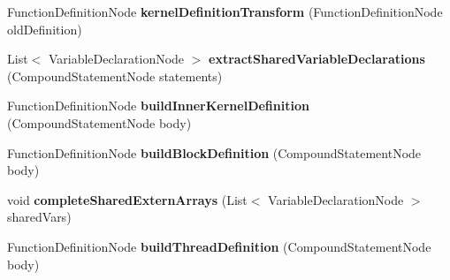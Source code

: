 \begin{DoxyCompactItemize}
\item 
\hypertarget{classedu_1_1udel_1_1cis_1_1vsl_1_1civl_1_1transform_1_1common_1_1Cuda2CIVLWorker_aab68991c068b8301152c6415f5c1abf0}{}Function\+Definition\+Node {\bfseries kernel\+Definition\+Transform} (Function\+Definition\+Node old\+Definition)\label{classedu_1_1udel_1_1cis_1_1vsl_1_1civl_1_1transform_1_1common_1_1Cuda2CIVLWorker_aab68991c068b8301152c6415f5c1abf0}

\item 
\hypertarget{classedu_1_1udel_1_1cis_1_1vsl_1_1civl_1_1transform_1_1common_1_1Cuda2CIVLWorker_a0e6116a6388fd13763df73e5a44b3aec}{}List$<$ Variable\+Declaration\+Node $>$ {\bfseries extract\+Shared\+Variable\+Declarations} (Compound\+Statement\+Node statements)\label{classedu_1_1udel_1_1cis_1_1vsl_1_1civl_1_1transform_1_1common_1_1Cuda2CIVLWorker_a0e6116a6388fd13763df73e5a44b3aec}

\item 
\hypertarget{classedu_1_1udel_1_1cis_1_1vsl_1_1civl_1_1transform_1_1common_1_1Cuda2CIVLWorker_af4fb2423199cd21cac115cbd0fb420e3}{}Function\+Definition\+Node {\bfseries build\+Inner\+Kernel\+Definition} (Compound\+Statement\+Node body)\label{classedu_1_1udel_1_1cis_1_1vsl_1_1civl_1_1transform_1_1common_1_1Cuda2CIVLWorker_af4fb2423199cd21cac115cbd0fb420e3}

\item 
\hypertarget{classedu_1_1udel_1_1cis_1_1vsl_1_1civl_1_1transform_1_1common_1_1Cuda2CIVLWorker_a314a1cc23c0183f60f23853bd979c1da}{}Function\+Definition\+Node {\bfseries build\+Block\+Definition} (Compound\+Statement\+Node body)\label{classedu_1_1udel_1_1cis_1_1vsl_1_1civl_1_1transform_1_1common_1_1Cuda2CIVLWorker_a314a1cc23c0183f60f23853bd979c1da}

\item 
\hypertarget{classedu_1_1udel_1_1cis_1_1vsl_1_1civl_1_1transform_1_1common_1_1Cuda2CIVLWorker_aa9914887876b2e10503ada12c13951ec}{}void {\bfseries complete\+Shared\+Extern\+Arrays} (List$<$ Variable\+Declaration\+Node $>$ shared\+Vars)\label{classedu_1_1udel_1_1cis_1_1vsl_1_1civl_1_1transform_1_1common_1_1Cuda2CIVLWorker_aa9914887876b2e10503ada12c13951ec}

\item 
\hypertarget{classedu_1_1udel_1_1cis_1_1vsl_1_1civl_1_1transform_1_1common_1_1Cuda2CIVLWorker_a1e5dcb22c51fdbbb6eb7764fe4309afa}{}Function\+Definition\+Node {\bfseries build\+Thread\+Definition} (Compound\+Statement\+Node body)\label{classedu_1_1udel_1_1cis_1_1vsl_1_1civl_1_1transform_1_1common_1_1Cuda2CIVLWorker_a1e5dcb22c51fdbbb6eb7764fe4309afa}


\end{DoxyCompactItemize}
